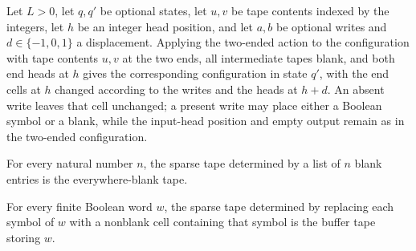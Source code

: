 \begin{lemma}
\label{Complexity.enumCont_ends_apply}
\leanok
{}
Let $L>0$, let $q,q'$ be optional states, let $u,v$ be tape contents indexed by the
integers, let $h$ be an integer head position, and let $a,b$ be optional writes and
$d\in\{-1,0,1\}$ a displacement. Applying the two-ended action to the configuration with
tape contents $u,v$ at the two ends, all intermediate tapes blank, and both end heads at
$h$ gives the corresponding configuration in state $q'$, with the end cells at $h$
changed according to the writes and the heads at $h+d$. An absent write leaves that cell
unchanged; a present write may place either a Boolean symbol or a blank, while the
input-head position and empty output remain as in the two-ended configuration.
\end{lemma}

\begin{lemma}
\label{Complexity.enumCont_sparse_blanks}
\leanok
{}
For every natural number $n$, the sparse tape determined by a list of $n$ blank entries
is the everywhere-blank tape.
\end{lemma}

\begin{lemma}
\label{Complexity.enumCont_sparse_some}
\leanok
{}
For every finite Boolean word $w$, the sparse tape determined by replacing each symbol
of $w$ with a nonblank cell containing that symbol is the buffer tape storing $w$.
\end{lemma}

